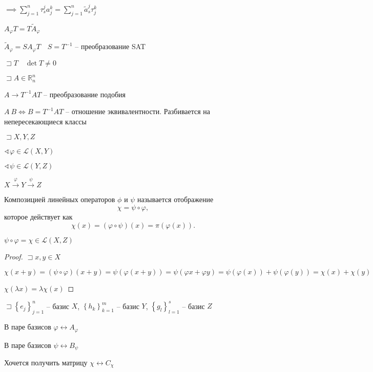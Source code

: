 \documentclass{book}
\newcommand\R{\ensuremath{\mathbb{R}}}
\newcommand{\tl}[1]{\widetilde{#1}}
\theoremstyle{definition}
\begin{document}
$\implies \sum_{j=1}^{n} \tau^j_sa^k_j = \sum_{j=1}^{n} \tl a^j_s\tau^k_j$ 

$A_{\varphi}T = T\tl A_{\varphi}$

 \begin{lemma}
     $\tl A_{\varphi} = S A_{\varphi}T\quad S = T^{-1}$ -- преобразование SAT
\end{lemma}

$\sqsupset T\quad \det T\neq 0$

$\sqsupset A\in \R_n^n$

$A \longrightarrow T^{-1}AT$ -- преобразование подобия

$A~B \iff B = T^{-1}AT$ -- отношение эквивалентности. Разбивается на непересекающиеся классы

$\sqsupset X, Y, Z$

$\sphericalangle \varphi\in\mathscr{L}(X, Y)$

$\sphericalangle \psi\in\mathscr{L}(Y, Z)$

$X \overset {\varphi}{\longrightarrow} Y \overset{\psi}{\longrightarrow} Z$

 \begin{definition}
     Композицией линейных операторов $\phi$ и  $\psi$ называется отображение  \[
     \chi = \psi \circ \varphi,
     \] 
      которое действует как \[
         \chi(x) = \left( \varphi\circ \psi \right) (x) = \pi\left( \varphi(x) \right) 
     .\] 
\end{definition}
\begin{lemma}
    $\psi\circ \varphi = \chi\in\mathscr{L}(X, Z)$
\end{lemma}
\begin{proof}
    $\sqsupset x, y\in X$

    $\chi(x+y) = \left(\psi\circ \varphi  \right)(x+y) = \psi\left( \varphi(x+y) \right) = \psi\left( \varphi x + \varphi y \right)  = \psi(\varphi (x)) + \psi(\varphi( y)) = \chi (x) + \chi (y)  $

    $\chi\left( \lambda x \right)  = \lambda \chi(x)$
\end{proof}

$\sqsupset \left\{ e_j \right\} _{j=1}^n$ -- базис $X$,  $\left\{ h_k \right\} _{k=1}^m$ -- базис $Y$,  $\left\{ g_l \right\} _{l=1}^s$ -- базис $Z$

В паре базисов  $\varphi \longleftrightarrow A_{\varphi}$

В паре базисов  $\psi \longleftrightarrow B_{\psi}$

Хочется получить матрицу  $\chi \longleftrightarrow C_{\chi}$
\end{document}
